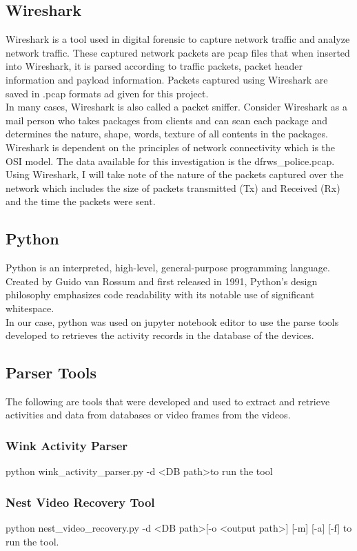 \documentclass{easychair}
\begin{document}
\subsection{Wireshark}
Wireshark is a tool used in digital forensic to capture network traffic and analyze network traffic. These captured network packets are pcap files that when inserted into Wireshark, it is parsed according to traffic packets, packet header information and payload information. Packets captured using Wireshark are saved in .pcap formats ad given for this project.\\
In many cases, Wireshark is also called a packet sniffer. Consider Wireshark as a mail person who takes packages from clients and can scan each package and determines the nature, shape, words, texture of all contents in the packages. Wireshark is dependent on the principles of network connectivity which is the OSI model. The data available for this investigation is the dfrws\_police.pcap. Using Wireshark, I will take note of the nature of the packets captured over the network which includes the size of packets transmitted (Tx) and Received (Rx) and the time the packets were sent.


\subsection{Python}
Python is an interpreted, high-level, general-purpose programming language. Created by Guido van Rossum and first released in 1991, Python's design philosophy emphasizes code readability with its notable use of significant whitespace. \cite{Ali_1} \\
In our case, python was used on jupyter notebook editor \cite{Ali_2} to use the parse tools developed to retrieves the activity records in the database of the devices.


\subsection{Parser Tools}
The following are tools that were developed and used to extract and retrieve activities and data from databases or video frames from the videos. \cite{Ali_3}
\subsubsection{Wink Activity Parser}
python wink\_activity\_parser.py -d \textless DB path\textgreater to run the tool
\subsubsection{Nest Video Recovery Tool}
python nest\_video\_recovery.py -d \textless DB path\textgreater [-o \textless output path\textgreater] [-m] [-a] [-f] to run the tool.
\end{document}
